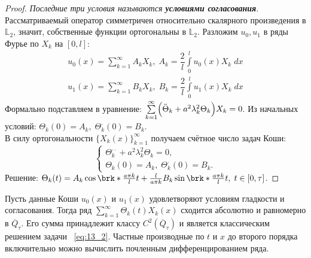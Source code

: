 \documentclass[../main.tex]{subfiles}
\begin{document}
\begin{proof}
\textit{Последние три условия называются \textbf{условиями согласования}}. \\
Рассматриваемый оператор симметричен относительно скалярного произведения в $\mathbb{L}_2$, значит, собственные функции ортогональны в $\mathbb{L}_2$. Разложим $u_0, u_1$ в ряды Фурье по $X_k$ на $[0, l]$:
\begin{align*}
	u_0(x) = \sum\limits_{k = 1}^{\infty} A_kX_k,\; A_k = \dfrac{2}{l} \int\limits_{0}^l u_0(x)X_k\;dx \\
	u_1(x) = \sum\limits_{k = 1}^{\infty} B_kX_k,\; B_k = \dfrac{2}{l} \int\limits_{0}^l u_1(x)X_k\;dx 
\end{align*}
Формально подставляем в уравнение: $\sum\limits_{k = 1}^{\infty} \Bigl( \ddot{\Theta}_k + a^2 \lambda_k^2\Theta_k \Bigr)X_k = 0$. Из начальных условий: $\Theta_k(0) = A_k,\; \Theta^{\cdotp}_k(0) = B_k$. \\
В силу ортогональности $\{X_k(x)\}_{k = 1}^{\infty}$ получаем счётное число задач Коши:
\begin{equation*}
\begin{cases}
	\Theta^{\cdotp \cdotp}_k + a^2 \lambda_k^2\Theta_k = 0, \\
	\Theta_k(0) = A_k,\; \Theta^{\cdotp}_k(0) = B_k.
\end{cases}
\end{equation*}
Решение: $\Theta_k(t) = A_k\cos \brk*{\frac{a \pi k}{l}}t + \frac{l}{a \pi k}B_k \sin \brk*{\frac{a \pi k}{l}}t,\; t \in [0, \tau]$. 
\end{proof}
\begin{theorem}
Пусть данные Коши $u_0(x)$ и $u_1(x)$ удовлетворяют условиям гладкости и согласования. Тогда ряд $\sum\limits_{k = 1}^{\infty}\Theta_k(t)X_k(x)$ сходится абсолютно и равномерно в $\overline{Q}_{\tau}$. Его сумма принадлежит классу $C^2(\overline{Q}_{\tau})$ и является классическим решением задачи ~\ref{eq:13_2}. Частные производные по $t$ и $x$ до второго порядка 
включительно можно вычислить почленным дифференцированием ряда.
\end{theorem} 
\end{document}
